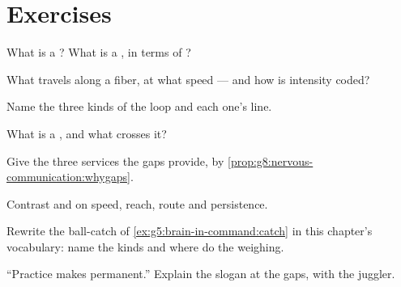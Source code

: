\section{Exercises}

\begin{exercise}[$\star$]\label{exo:g8:nervous-communication:1}
What is a ? What is a , in terms of ?
\end{exercise}

\begin{exercise}[$\star$]\label{exo:g8:nervous-communication:2}
What travels along a fiber, at what speed --- and how is
intensity coded?
\end{exercise}

\begin{exercise}[$\star$]\label{exo:g8:nervous-communication:3}
Name the three  kinds of the loop and each one's
line.
\end{exercise}

\begin{exercise}[$\star$]\label{exo:g8:nervous-communication:4}
What is a , and what crosses it?
\end{exercise}

\begin{exercise}[$\star$]\label{exo:g8:nervous-communication:5}
Give the three services the gaps provide, by
\cref{prop:g8:nervous-communication:whygaps}.
\end{exercise}

\begin{exercise}[$\star$]\label{exo:g8:nervous-communication:6}
Contrast  and  on speed, reach, route and
persistence.
\end{exercise}

\begin{exercise}[$\star\star$]\label{exo:g8:nervous-communication:7}
Rewrite the ball-catch of
\cref{ex:g5:brain-in-command:catch} in this chapter's
vocabulary: name the  kinds and where  do
the weighing.
\end{exercise}

\begin{exercise}[$\star\star$]\label{exo:g8:nervous-communication:8}
``Practice makes permanent.'' Explain the slogan at the
gaps, with the juggler.
\end{exercise}

